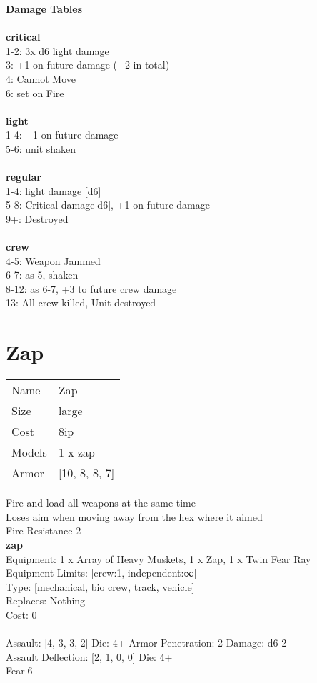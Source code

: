 {\bf Damage Tables} \\
\ \\ {\bf critical } \\
1-2: 3x d6 light damage \\
3: +1 on future damage (+2 in total) \\
4: Cannot Move \\
6: set on Fire \\
\ \\ {\bf light } \\
1-4: +1 on future damage \\
5-6: unit shaken \\
\ \\ {\bf regular } \\
1-4: light damage [d6] \\
5-8: Critical damage[d6], +1 on future damage \\
9+: Destroyed \\
\ \\ {\bf crew } \\
4-5: Weapon Jammed \\
6-7: as 5, shaken \\
8-12: as 6-7, +3 to future crew damage \\
13: All crew killed, Unit destroyed \\










\pagebreak\pagebreak

\section{ Zap }

\begin{tabular}{ll}
  Name & Zap \\
  Size & large\\
  Cost & 8ip\\
  Models & 1 x zap\\
  Armor & [10, 8, 8, 7]\\
\end{tabular}

\noindent Fire and load all weapons at the same time\\ 
Loses aim when moving away from the hex where it aimed\\ 
Fire Resistance 2\\ 


{\bf zap } \\
Equipment: 1 x Array of Heavy Muskets, 1 x Zap, 1 x Twin Fear Ray \\
Equipment Limits: [crew:1, independent:∞] \\
Type: [mechanical, bio crew, track, vehicle] \\
Replaces: Nothing \\
Cost: 0\\
\ \\
Assault: [4, 3, 3, 2] Die: 4+ Armor Penetration: 2 Damage: d6-2 \\
Assault Deflection: [2, 1, 0, 0] Die: 4+\\
\indent Fear[6]\\ 
 
